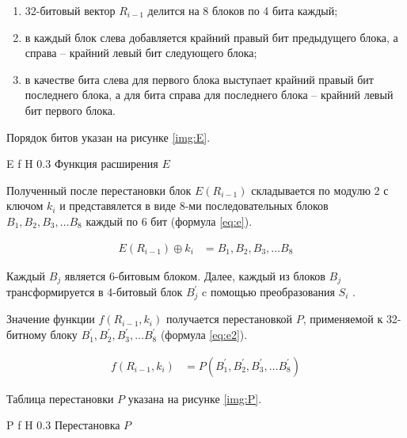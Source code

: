 \begin{enumerate}
	\item 32-битовый вектор $R_{i-1}$ делится на 8 блоков по 4 бита каждый;
	\item в каждый блок слева добавляется крайний правый бит предыдущего блока, а справа -- крайний левый бит следующего блока;
	\item в качестве бита слева для первого блока выступает крайний правый бит последнего блока, а для бита справа для последнего блока -- крайний левый бит первого блока.
\end{enumerate}

Порядок битов указан на рисунке \ref{img:E}.

{E} %
{f} %
{H} %
{0.3\textwidth} %
{Функция расширения $E$} %

Полученный после перестановки блок $E(R_{i-1})$ складывается по модулю 2 с ключом $k_i$ и представялется в виде 8-ми последовательных блоков $B_1, B_2, B_3, \ldots B_8$ каждый по 6 бит (формула \ref{eq:e}).

\begin{equation}
	\label{eq:e}
	\begin{aligned}
		E(R_{i-1}) \oplus k_i &= B_1, B_2, B_3, \ldots B_8
	\end{aligned}
\end{equation}

Каждый $B_j$ является  6-битовым блоком. Далее, каждый из блоков $B_j$ трансформируется в 4-битовый блок $B^{'}_{j}$ c помощью преобразования $S_i$ \cite{info_DES}.

Значение функции $f(R_{i-1}, k_i)$ получается перестановкой $P$, применяемой к 32-битному блоку $B^{'}_1, B^{'}_2, B^{'}_3, \ldots B^{'}_8$ (формула \ref{eq:e2}).

\begin{equation}
	\label{eq:e2}
	\begin{aligned}
		f(R_{i-1}, k_i) &= P(B^{'}_1, B^{'}_2, B^{'}_3, \ldots B^{'}_8)
	\end{aligned}
\end{equation}

Таблица перестановки $P$ указана на рисунке \ref{img:P}.

{P} %
{f} %
{H} %
{0.3\textwidth} %
{Перестановка $P$} %

